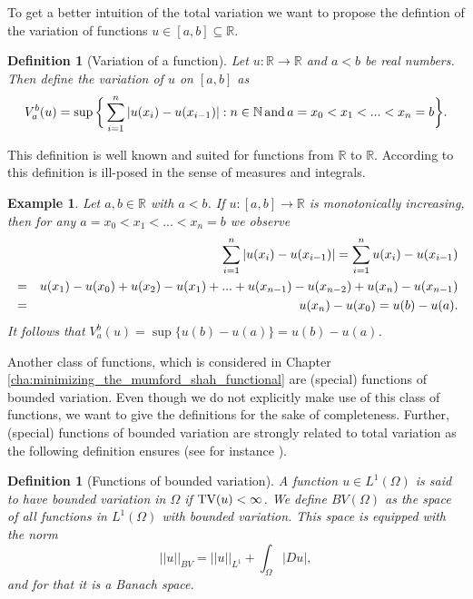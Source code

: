 \documentclass[abstracton]{scrreprt}
\newtheorem{definition}[theorem]{Definition}
\newtheorem{example}[theorem]{Example}
\begin{document}
        To get a better intuition of the total variation we want to propose the defintion of the variation of functions $u \in [a, b] \subseteq \mathbb{R}$.
        \begin{definition}[Variation of a function] %
        \label{def:variation_of_a_function}
            Let $u: \mathbb{R} \longrightarrow \mathbb{R}$ and $a < b$ be real numbers. Then define the variation of $u$ on $[a, b]$ as
                $$
                    V^{b}_{a}(u) = \sup \bigg\{ \sum_{i = 1}^{n} |u(x_{i}) - u(x_{i - 1})| : n \in \mathbb{N} \,\textnormal{and}\, a = x_{0} < x_{1} < ... < x_{n} = b \bigg\}.
                $$
        \end{definition}
        This definition is well known and suited for functions from $\mathbb{R}$ to $\mathbb{R}$. According to \cite{Giusti} this definition is ill-posed in the sense of measures and integrals.
        \begin{example} %
        \label{ex:total_variation_one_d}
            Let $a, b \in \mathbb{R}$ with $a < b$. If $u: [a, b] \longrightarrow \mathbb{R}$ is monotonically increasing, then for any $a = x_{0} < x_{1} < ... < x_{n} = b$ we observe
                \begin{eqnarray}
                    &&\sum_{i = 1}^{n} |u(x_{i}) - u(x_{i-1})| = \sum_{i = 1}^{n} u(x_{i}) - u(x_{i-1}) \notag \\
                    &=& u(x_{1}) - u(x_{0}) + u(x_{2}) - u(x_{1}) + ... + u(x_{n-1}) - u(x_{n-2}) + u(x_{n}) - u(x_{n-1}) \notag \\
                    &=& u(x_{n}) - u(x_{0}) = u(b) - u(a). \notag
                \end{eqnarray}
            It follows that $V^{b}_{a}(u) = \sup \{u(b) - u(a)\} = u(b) - u(a)$.
        \end{example}
        Another class of functions, which is considered in Chapter \ref{cha:minimizing_the_mumford_shah_functional}
        are (special) functions of bounded variation. Even though we do not explicitly make use of this class of functions, we want to give the definitions for the sake of completeness. Further, (special) functions of bounded variation are strongly related to total variation as the following definition ensures (see for instance \cite{Giusti}).
        \begin{definition}[Functions of bounded variation]
        \label{def:functions_of_bounded_variation}
            A function $u \in L^{1}(\Omega)$ is said to have bounded variation in $\Omega$ if $\textnormal{TV}(u) < \infty$. We define $BV(\Omega)$ as the space of all functions in $L^{1}(\Omega)$ with bounded variation. This space is equipped with the norm
                $$
                    ||u||_{BV} = ||u||_{L^{1}} + \int_{\Omega} |Du|,
                $$
            and for that it is a Banach space.
        \end{definition}
\end{document}
